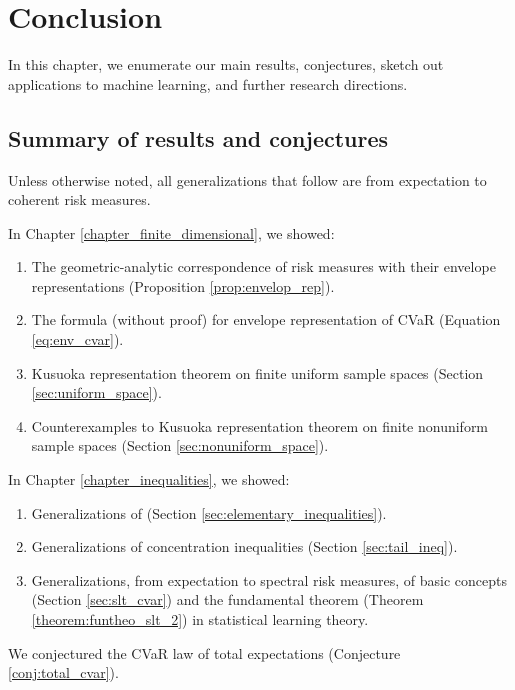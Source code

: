 
\chapter{Conclusion}
\label{chapter_conclusion}
In this chapter, we enumerate our main results, conjectures, sketch out applications to machine learning, and further research directions.

\section{Summary of results and conjectures}
Unless otherwise noted, all generalizations that follow are from expectation to coherent risk measures.

In Chapter \ref{chapter_finite_dimensional}, we showed:
\begin{enumerate}
	\item The geometric-analytic correspondence of risk measures with their envelope representations (Proposition \ref{prop:envelop_rep}).
	\item The formula (without proof) for envelope representation of CVaR (Equation \ref{eq:env_cvar}).
	\item Kusuoka representation theorem on finite uniform sample spaces (Section \ref{sec:uniform_space}).
	\item Counterexamples to Kusuoka representation theorem on finite nonuniform sample spaces (Section \ref{sec:nonuniform_space}).
\end{enumerate}

In Chapter \ref{chapter_inequalities}, we showed:
\begin{enumerate}
	\item Generalizations of (Section \ref{sec:elementary_inequalities}).
	\item Generalizations of concentration inequalities (Section \ref{sec:tail_ineq}).
	\item Generalizations, from expectation to spectral risk measures, of basic concepts (Section \ref{sec:slt_cvar}) and the fundamental theorem (Theorem \ref{theorem:funtheo_slt_2}) in statistical learning theory.
\end{enumerate}
We conjectured the CVaR law of total expectations (Conjecture \ref{conj:total_cvar}).

